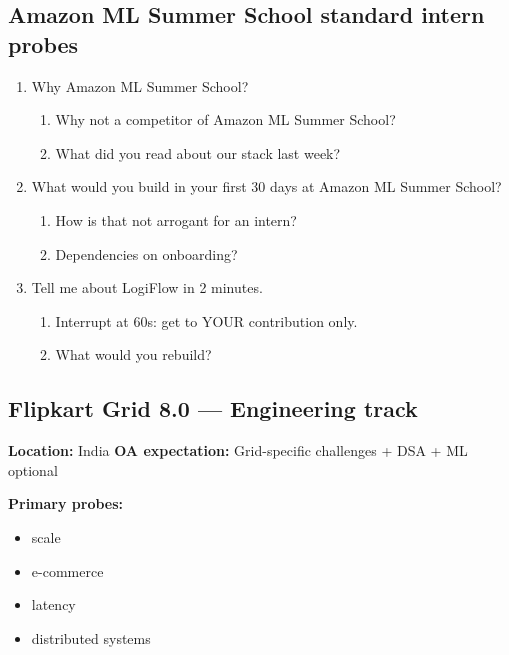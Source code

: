 \documentclass[9pt,a4paper]{article}
\begin{document}
\subsection{Amazon ML Summer School standard intern probes}
\begin{enumerate}[label=\textbf{Q\arabic*:}, leftmargin=*]
  \item Why Amazon ML Summer School?
  \begin{enumerate}[label=\textit{FU\arabic*:}, leftmargin=2em]
    \item Why not a competitor of Amazon ML Summer School?
    \item What did you read about our stack last week?
  \end{enumerate}
  \item What would you build in your first 30 days at Amazon ML Summer School?
  \begin{enumerate}[label=\textit{FU\arabic*:}, leftmargin=2em]
    \item How is that not arrogant for an intern?
    \item Dependencies on onboarding?
  \end{enumerate}
  \item Tell me about LogiFlow in 2 minutes.
  \begin{enumerate}[label=\textit{FU\arabic*:}, leftmargin=2em]
    \item Interrupt at 60s: get to YOUR contribution only.
    \item What would you rebuild?
  \end{enumerate}
\end{enumerate}
\newpage
\subsection{Flipkart Grid 8.0 --- Engineering track}
\textbf{Location:} India \quad \textbf{OA expectation:} Grid-specific challenges + DSA + ML optional

\textbf{Primary probes:}
\begin{itemize}
  \item scale
  \item e-commerce
  \item latency
  \item distributed systems
\end{itemize}
\end{document}
